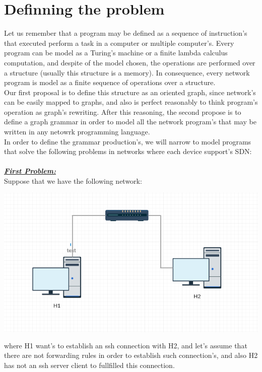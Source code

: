 \documentclass[envcountsect,runningheads]{llncs}
\begin{document}
\section{Definning the problem}
Let us remember that a program may be defined as a sequence of instruction's that executed 
perform a task in a computer or multiple computer's. Every program can be model as a Turing's 
machine or a finite lambda calculus computation, and despite of the model chosen, the 
operations are performed over a structure (usually this structure is a memory). In consequence,
every network program is model as a finite sequence of operations over a structure.\\
Our first proposal is to define this structure as an oriented graph, since network's 
can be easily mapped to graphs, and also is perfect reasonably to think 
program's operation as graph's rewriting. After this reasoning, the second propose is to define
a graph grammar in order to model all the network program's that may be written in any netowrk
programming language. \\
In order to define the grammar production's, we will narrow to model 
programs that solve the following problems in networks where each device support's SDN:\\
\\
\textbf{\underline{\textit{First Problem:}}} \\
Suppose that we have the following network:\\
\includegraphics[width=\textwidth, height=8cm]{first_example.png}\\  
where H1 want's to establish an ssh 
connection with H2, and let's assume that there are not forwarding rules in 
order to establish such connection's, and also H2 has not an ssh server client to 
fullfilled this connection. \\
\end{document}
